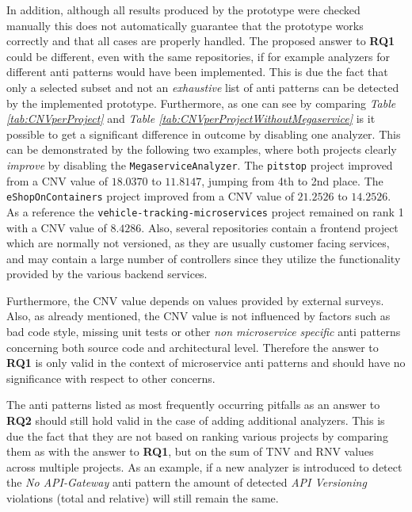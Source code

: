 \documentclass{article}
\begin{document}
In addition, although all results produced by the prototype were checked manually this does not automatically guarantee that the prototype works correctly and that all cases are properly handled.
The proposed answer to \textbf{RQ1} could be different, even with the same repositories, if for example analyzers for different anti patterns would have been implemented.
This is due the fact that only a selected subset and not an \textit{exhaustive} list of anti patterns can be detected by the implemented prototype.
Furthermore, as one can see by comparing \textit{Table \ref{tab:CNVperProject}} and \textit{Table \ref{tab:CNVperProjectWithoutMegaservice}} is it possible to get a significant difference in outcome by disabling one analyzer.
This can be demonstrated by the following two examples, where both projects clearly \textit{improve} by disabling the \lstinline{MegaserviceAnalyzer}.
The \lstinline{pitstop} project improved from a CNV value of $18.0370$ to $11.8147$, jumping from 4th to 2nd place.
The \lstinline{eShopOnContainers} project improved from a CNV value of $21.2526$ to $14.2526$.
As a reference the \lstinline{vehicle-tracking-microservices} project remained on rank 1 with a CNV value of $8.4286$.
Also, several repositories contain a frontend project which are normally not versioned, as they are usually customer facing services, and may contain a large number of controllers since they utilize the functionality provided by the various backend services. \newline

Furthermore, the CNV value depends on values provided by external surveys.
Also, as already mentioned, the CNV value is not influenced by factors such as bad code style, missing unit tests or other \textit{non microservice specific} anti patterns concerning both source code and architectural level.
Therefore the answer to \textbf{RQ1} is only valid in the context of microservice anti patterns and should have no significance with respect to other concerns. \newline

The anti patterns listed as most frequently occurring pitfalls as an answer to \textbf{RQ2} should still hold valid in the case of adding additional analyzers.
This is due the fact that they are not based on ranking various projects by comparing them as with the answer to \textbf{RQ1}, but on the sum of TNV and RNV values across multiple projects.
As an example, if a new analyzer is introduced to detect the \textit{No API-Gateway} anti pattern the amount of detected \textit{API Versioning} violations (total and relative) will still remain the same.
\end{document}
